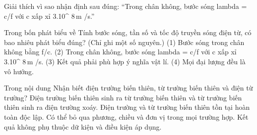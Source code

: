 \begin{bt}
Giải thích vì sao nhận định sau đúng: “Trong chân không, bước sóng lambda = c/f với c xấp xỉ 3.10^ $8\,\text{m}$ /s.”
\end{bt}

\begin{ex}
Trong bốn phát biểu về Tính bước sóng, tần số và tốc độ truyền sóng điện từ, có bao nhiêu phát biểu đúng? (Chỉ ghi một số nguyên.) (1) Bước sóng trong chân không bằng f/c. (2) Trong chân không, bước sóng lambda = c/f với c xấp xỉ 3.10^ $8\,\text{m}$ /s. (3) Kết quả phải phù hợp ý nghĩa vật lí. (4) Mọi đại lượng đều là vô hướng.
\end{ex}

\begin{ex}
Trong nội dung Nhận biết điện trường biến thiên, từ trường biến thiên và điện từ trường?
\choice
{\True Điện trường biến thiên sinh ra từ trường biến thiên và từ trường biến thiên sinh ra điện trường xoáy.}
{Điện trường và từ trường biến thiên tồn tại hoàn toàn độc lập.}
{Có thể bỏ qua phương, chiều và đơn vị trong mọi trường hợp.}
{Kết quả không phụ thuộc dữ kiện và điều kiện áp dụng.}
\end{ex}

